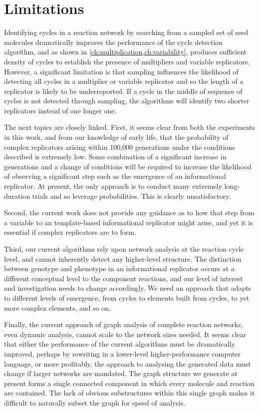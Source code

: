 \section{Limitations}\label{sec:limitations}

Identifying cycles in a reaction network by searching from a sampled set of seed molecules dramatically improves the performance of the cycle detection algorithm, and as shown in \cref{ch:multiplication,ch:variability}, produces sufficient density of cycles to establish the presence of multipliers and variable replicators. However, a significant limitation is that sampling influences the likelihood of detecting all cycles in a multiplier or variable replicator and so the length of a replicator is likely to be underreported. If a cycle in the middle of sequence of cycles is not detected through sampling, the algorithms will identify two shorter replicators instead of one longer one. 

The next topics are closely linked. First, it seems clear from both the experiments in this work, and from our knowledge of early life, that the probability of complex replicators arising within 100,000 generations under the conditions described is extremely low. Some combination of a significant increase in generations and a change of conditions will be required to increase the likelihood of observing a significant step such as the emergence of an informational replicator. At present, the only approach is to conduct many extremely long-duration trials and so leverage probabilities. This is clearly unsatisfactory.

Second, the current work does not provide any guidance as to how that step from a variable to an template-based informational replicator might arise, and yet it is essential if complex replicators are to form. 

Third, our current algorithms rely upon network analysis at the reaction cycle level, and cannot inherently detect any higher-level structure. The distinction between genotype and phenotype in an informational replicator occurs at a different conceptual level to the component reactions, and our level of interest and investigation needs to change accordingly. We need an approach that adapts to different levels of emergence, from cycles to elements built from cycles, to yet more complex elements, and so on. 

Finally, the current approach of graph analysis of complete reaction networks, even dynamic analysis, cannot scale to the network sizes needed. It seems clear that either the performance of the current algorithms must be dramatically improved, perhaps by rewriting in a lower-level higher-performance computer language, or more profitably, the approach to analysing the generated data must change if larger networks are mandated. The graph structure we generate at present forms a single connected component in which every molecule and reaction are contained. The lack of obvious substructures within this single graph makes it difficult to naturally subset the graph for speed of analysis.

